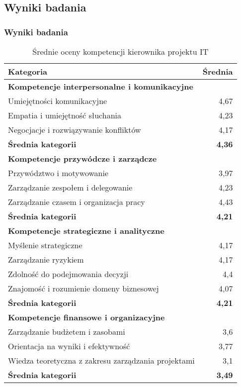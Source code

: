 \subsection{Wyniki badania}

\subsubsection{Wyniki badania}

\begin{longtable}{p{10cm} r}
  \caption{Średnie oceny kompetencji kierownika projektu IT}
  \toprule
  \textbf{Kategoria} & \textbf{Średnia} \\
  \midrule
  \multicolumn{2}{l}{\textbf{Kompetencje interpersonalne i komunikacyjne}} \\
  Umiejętności komunikacyjne & 4{,}67 \\
  Empatia i umiejętność słuchania & 4{,}23 \\
  Negocjacje i rozwiązywanie konfliktów & 4{,}17 \\
  \textbf{Średnia kategorii} & \textbf{4{,}36} \\
  \midrule
  \multicolumn{2}{l}{\textbf{Kompetencje przywódcze i zarządcze}} \\
  Przywództwo i motywowanie & 3{,}97 \\
  Zarządzanie zespołem i delegowanie & 4{,}23 \\
  Zarządzanie czasem i organizacja pracy & 4{,}43 \\
  \textbf{Średnia kategorii} & \textbf{4{,}21} \\
  \midrule
  \multicolumn{2}{l}{\textbf{Kompetencje strategiczne i analityczne}} \\
  Myślenie strategiczne & 4{,}17 \\
  Zarządzanie ryzykiem & 4{,}17 \\
  Zdolność do podejmowania decyzji & 4{,}4 \\
  Znajomość i rozumienie domeny biznesowej & 4{,}07 \\
  \textbf{Średnia kategorii} & \textbf{4{,}21} \\
  \midrule
  \multicolumn{2}{l}{\textbf{Kompetencje finansowe i organizacyjne}} \\
  Zarządzanie budżetem i zasobami & 3{,}6 \\
  Orientacja na wyniki i efektywność & 3{,}77 \\
  Wiedza teoretyczna z zakresu zarządzania projektami & 3{,}1 \\
  \textbf{Średnia kategorii} & \textbf{3{,}49} \\

\end{longtable}
